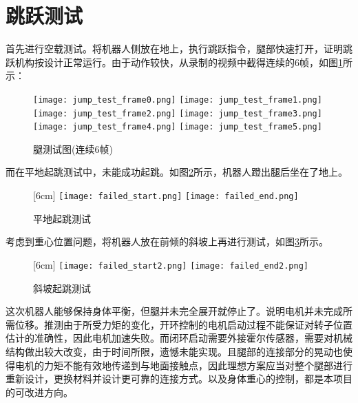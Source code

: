 \section{跳跃测试}
首先进行空载测试。将机器人侧放在地上，执行跳跃指令，腿部快速打开，证明跳跃机构按设计正常运行。由于动作较快，从录制的视频中截得连续的6帧，如图\ref{fig:jump_test}所示：
\begin{figure}[H]
  \centering
    {\texttt{[image: jump\_test\_frame0.png]}}
      {\texttt{[image: jump\_test\_frame1.png]}}
      {\texttt{[image: jump\_test\_frame2.png]}}
      {\texttt{[image: jump\_test\_frame3.png]}}
      {\texttt{[image: jump\_test\_frame4.png]}}
      {\texttt{[image: jump\_test\_frame5.png]}}
  \caption{腿测试图(连续6帧)}
  \label{fig:jump_test}
\end{figure}
而在平地起跳测试中，未能成功起跳。如图\ref{fig:failed_test0}所示，机器人蹬出腿后坐在了地上。
\begin{figure}[H]
  \centering
  [6cm] 
    {\texttt{[image: failed\_start.png]}}
  \hspace{4em}
      {\texttt{[image: failed\_end.png]}}
  \caption{平地起跳测试}
  \label{fig:failed_test0}
\end{figure}
考虑到重心位置问题，将机器人放在前倾的斜坡上再进行测试，如图\ref{fig:failed_test1}所示。
\begin{figure}[H]
  \centering
  [6cm] 
    {\texttt{[image: failed\_start2.png]}}
  \hspace{4em}
      {\texttt{[image: failed\_end2.png]}}
  \caption{斜坡起跳测试}
  \label{fig:failed_test1}
\end{figure}
这次机器人能够保持身体平衡，但腿并未完全展开就停止了。说明电机并未完成所需位移。推测由于所受力矩的变化，开环控制的电机启动过程不能保证对转子位置估计的准确性，因此电机加速失败。而闭环启动需要外接霍尔传感器，需要对机械结构做出较大改变，由于时间所限，遗憾未能实现。且腿部的连接部分的晃动也使得电机的力矩不能有效地传递到与地面接触点，因此理想方案应当对整个腿部进行重新设计，更换材料并设计更可靠的连接方式。以及身体重心的控制，都是本项目的可改进方向。

